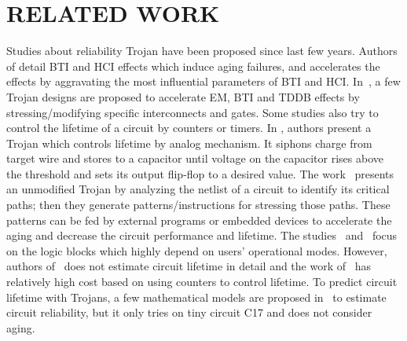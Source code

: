 \section{RELATED WORK}
\label{sec:related}
Studies about reliability Trojan have been proposed since last few years. Authors of \cite{shiyanovskii2010process} detail BTI and HCI effects which induce aging failures, and accelerates the effects by aggravating the most influential parameters of BTI and HCI. In~\cite{sreedhar2012reliability}, a few Trojan designs are proposed to accelerate EM, BTI and TDDB effects by stressing/modifying specific interconnects and gates. Some studies also try to control the lifetime of a circuit by counters or timers. In \cite{yang2016a2}, authors present a Trojan which controls lifetime by analog mechanism. It siphons charge from target wire and stores to a capacitor until voltage on the capacitor rises above the threshold and sets its output flip-flop to a desired value.  The work~\cite{karimi2015magic} presents an unmodified Trojan by analyzing the netlist of a circuit to identify its critical paths; then they generate patterns/instructions for stressing those paths. These patterns can be fed by external programs or embedded devices to accelerate the aging and decrease the circuit performance and lifetime. The studies~\cite{yang2016a2} and~\cite{karimi2015magic} focus on the logic blocks which highly depend on users' operational modes. However, authors of~\cite{shiyanovskii2010process} does not estimate circuit lifetime in detail and the work of~\cite{sreedhar2012reliability} has relatively high cost based on using counters to control lifetime. To predict circuit lifetime with Trojans, a few mathematical models are proposed in~\cite{burman2012effect} to estimate circuit reliability, but it only tries on tiny circuit C17 and does not consider aging. %

